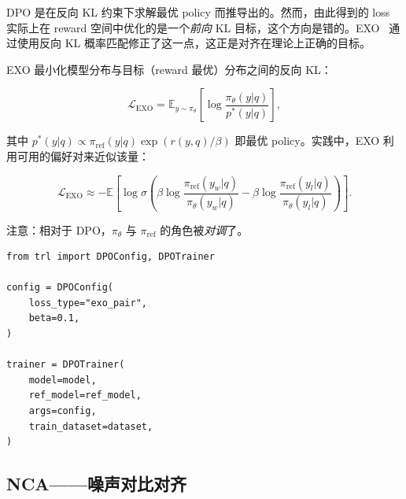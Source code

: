 \begin{intuitionbox}[DPO 的 KL 方向问题]
DPO 是在反向 KL 约束下求解最优 policy 而推导出的。然而，由此得到的 loss 实际上在 reward 空间中优化的是一个\emph{前向} KL 目标，这个方向是错的。EXO~\cite{ji2024exo} 通过使用反向 KL 概率匹配修正了这一点，这正是对齐在理论上正确的目标。
\end{intuitionbox}

EXO 最小化模型分布与目标（reward 最优）分布之间的反向 KL：

\[
\mathcal{L}_{\text{EXO}} = \mathbb{E}_{y \sim \pi_\theta}\!\left[
    \log \frac{\pi_\theta(y|q)}{p^*(y|q)}
  \right],
\]

其中 $p^*(y|q) \propto \pi_{\text{ref}}(y|q) \exp(r(y,q)/\beta)$ 即最优 policy。实践中，EXO 利用可用的偏好对来近似该量：

\[
\mathcal{L}_{\text{EXO}} \approx -\mathbb{E}\!\left[
    \log \sigma\!\left(
      \beta \log \frac{\pi_{\text{ref}}(y_w|q)}{\pi_\theta(y_w|q)}
      - \beta \log \frac{\pi_{\text{ref}}(y_l|q)}{\pi_\theta(y_l|q)}
    \right)
  \right].
\]

注意：相对于 DPO，$\pi_\theta$ 与 $\pi_{\text{ref}}$ 的角色被\emph{对调}了。

\begin{examplebox}
\begin{lstlisting}[style=pythonstyle]
from trl import DPOConfig, DPOTrainer

config = DPOConfig(
    loss_type="exo_pair",
    beta=0.1,
)

trainer = DPOTrainer(
    model=model,
    ref_model=ref_model,
    args=config,
    train_dataset=dataset,
)
\end{lstlisting}
\end{examplebox}

\subsection{NCA——噪声对比对齐}
\label{sec:nca}

